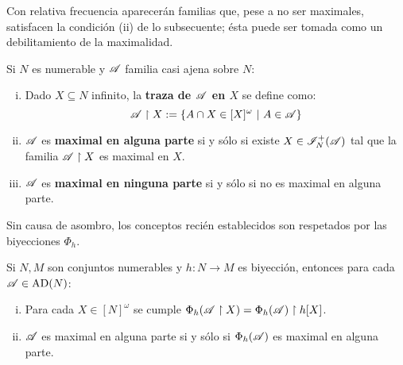 Con relativa frecuencia aparecerán familias que, pese a no ser maximales, satisfacen la condición (ii) de lo subsecuente; ésta puede ser tomada como un debilitamiento de la maximalidad.

\begin{definicion}\label{def-MaxEnAlguna}
	Si $N$ es numerable y $\mathscr{A}$ familia casi ajena sobre $N$:
	\begin{enumerate}[i)]
		\item Dado $X \subseteq N$ infinito, la \textbf{traza de $\mathscr{A}$ en $X$} se define como:
		      $$ \mathscr{A} \upharpoonright X := \{ A \cap X \in [X]^\omega \text{ $|$ } A \in \mathscr{A} \} $$
		\item $\mathscr{A}$ es \textbf{maximal en alguna parte} si y sólo si existe $X \in \mathscr{I}_N^+(\mathscr{A})$ tal que la familia $\mathscr{A} \upharpoonright X$ es maximal en $X$.
		\item $\mathscr{A}$ es \textbf{maximal en ninguna parte} si y sólo si no es maximal en alguna parte.
	\end{enumerate}
\end{definicion}

Sin causa de asombro, los conceptos recién establecidos son respetados por las biyecciones $\Phi_h$.

\begin{proposicion}
	Si $N,M$ son conjuntos numerables y $h:N \to M$ es biyección, entonces para cada $\mathscr{A} \in \operatorname{AD}(N)$:
	\begin{enumerate}[i)]
		\item Para cada $X \in [N]^\omega$ se cumple $\Phi_h(\mathscr{A} \upharpoonright X)=\Phi_h(\mathscr{A}) \upharpoonright h[X]$.
		\item $\mathscr{A}$ es maximal en alguna parte si y sólo si $\Phi_h(\mathscr{A})$ es maximal en alguna parte.
	\end{enumerate}
\end{proposicion}

